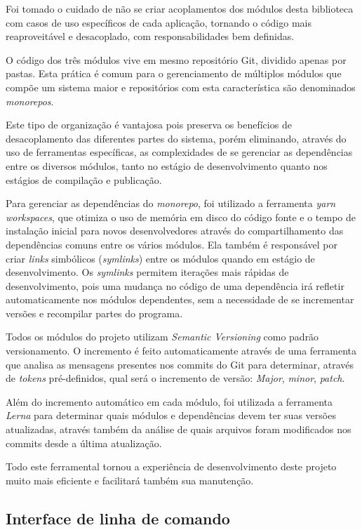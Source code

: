 \documentclass[]{politex}
\begin{document}
Foi tomado o cuidado de não se criar acoplamentos dos módulos desta biblioteca com casos de uso específicos de cada aplicação, tornando o código mais reaproveitável e desacoplado, com responsabilidades bem definidas.

O código dos três módulos vive em mesmo repositório Git, dividido apenas por pastas. Esta prática é comum para o gerenciamento de múltiplos módulos que compõe um sistema maior e  repositórios com esta característica são denominados \textit{monorepos}.

Este tipo de organização é vantajosa pois preserva os benefícios de desacoplamento das diferentes partes do sistema, porém eliminando, através do uso de ferramentas específicas, as complexidades de se gerenciar as dependências entre os diversos módulos, tanto no estágio de desenvolvimento quanto nos estágios de compilação e publicação.

Para gerenciar as dependências do \textit{monorepo}, foi utilizado a ferramenta \textit{yarn workspaces}, que otimiza o uso de memória em disco do código fonte e o tempo de instalação inicial para novos desenvolvedores através do compartilhamento das dependências comuns entre os vários módulos. Ela também é responsável por criar \textit{links} simbólicos (\textit{symlinks}) entre os módulos quando em estágio de desenvolvimento. Os \textit{symlinks} permitem iterações mais rápidas de desenvolvimento, pois uma mudança no código de uma dependência irá refletir automaticamente nos módulos dependentes, sem a necessidade de se incrementar versões e recompilar partes do programa.

Todos os módulos do projeto utilizam \textit{Semantic Versioning} como padrão versionamento. O incremento é feito automaticamente através de uma ferramenta que analisa as mensagens presentes nos commits do Git para determinar, através de \textit{tokens} pré-definidos, qual será o incremento de versão: \textit{Major}, \textit{minor}, \textit{patch}.

Além do incremento automático em cada módulo, foi utilizada a ferramenta \textit{Lerna} para determinar quais módulos e dependências devem ter suas versões atualizadas, através também da análise de quais arquivos foram modificados nos commits desde a última atualização.

Todo este ferramental tornou a experiência de desenvolvimento deste projeto muito mais eficiente e facilitará também sua manutenção.

\subsection{Interface de linha de comando}
\end{document}
